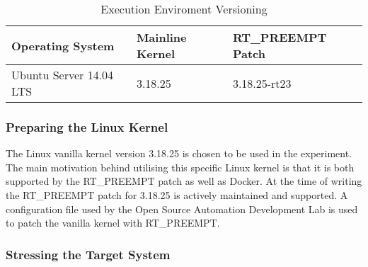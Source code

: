 \begin{table}[h]
\begin{tabular}{|l|l|l|}
\hline
\textbf{Operating System} & \textbf{Mainline Kernel} & \textbf{RT\_PREEMPT Patch} \\ \hline
Ubuntu Server 14.04 LTS     & 3.18.25                  &  3.18.25-rt23               \\ \hline
\end{tabular}
\centering
\caption{Execution Enviroment Versioning}
\label{table:execution-version}
\end{table}

\subsubsection*{Preparing the Linux Kernel}
The Linux vanilla kernel version 3.18.25 is chosen to be used in the experiment. The main motivation behind utilising this specific Linux kernel is that it is both supported by the RT\_PREEMPT patch as well as Docker. At the time of writing the RT\_PREEMPT patch for 3.18.25 is actively maintained and supported. A configuration file used by the Open Source Automation Development Lab \cite{OSADL} is used to patch the vanilla kernel with RT\_PREEMPT.

\subsubsection*{Stressing the Target System}
\begin{center}\end{center}


